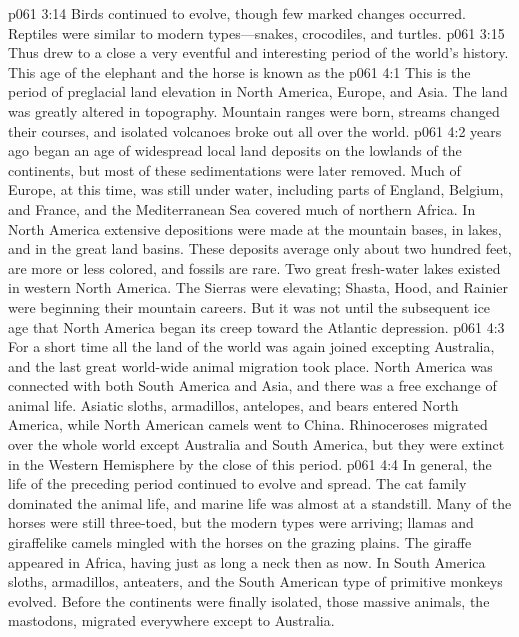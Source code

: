\vs p061 3:14 Birds continued to evolve, though few marked changes occurred. Reptiles were similar to modern types---snakes, crocodiles, and turtles.
\pc \vs p061 3:15 Thus drew to a close a very eventful and interesting period of the world’s history. This age of the elephant and the horse is known as the 
\vs p061 4:1 This is the period of preglacial land elevation in North America, Europe, and Asia. The land was greatly altered in topography. Mountain ranges were born, streams changed their courses, and isolated volcanoes broke out all over the world.
\pc \vs p061 4:2  years ago began an age of widespread local land deposits on the lowlands of the continents, but most of these sedimentations were later removed. Much of Europe, at this time, was still under water, including parts of England, Belgium, and France, and the Mediterranean Sea covered much of northern Africa. In North America extensive depositions were made at the mountain bases, in lakes, and in the great land basins. These deposits average only about two hundred feet, are more or less colored, and fossils are rare. Two great fresh\hyp{}water lakes existed in western North America. The Sierras were elevating; Shasta, Hood, and Rainier were beginning their mountain careers. But it was not until the subsequent ice age that North America began its creep toward the Atlantic depression.\plusone
\vs p061 4:3 For a short time all the land of the world was again joined excepting Australia, and the last great world\hyp{}wide animal migration took place. North America was connected with both South America and Asia, and there was a free exchange of animal life. Asiatic sloths, armadillos, antelopes, and bears entered North America, while North American camels went to China. Rhinoceroses migrated over the whole world except Australia and South America, but they were extinct in the Western Hemisphere by the close of this period.
\vs p061 4:4 In general, the life of the preceding period continued to evolve and spread. The cat family dominated the animal life, and marine life was almost at a standstill. Many of the horses were still three\hyp{}toed, but the modern types were arriving; llamas and giraffelike camels mingled with the horses on the grazing plains. The giraffe appeared in Africa, having just as long a neck then as now. In South America sloths, armadillos, anteaters, and the South American type of primitive monkeys evolved. Before the continents were finally isolated, those massive animals, the mastodons, migrated everywhere except to Australia.

